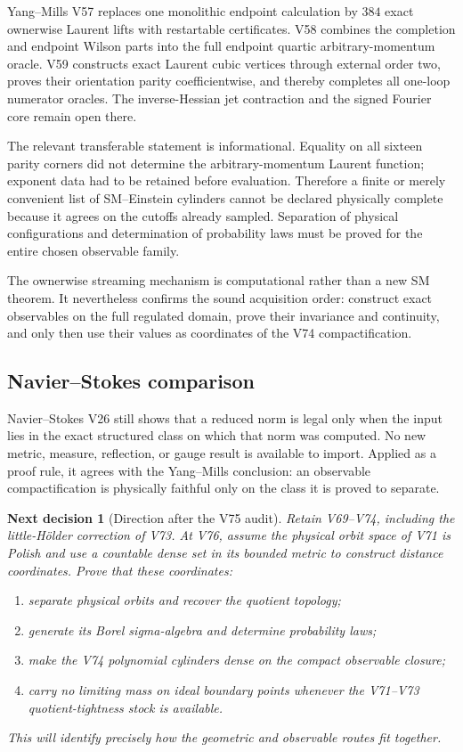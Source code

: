\documentclass[11pt]{article}
\newtheorem{decision}[theorem]{Next decision}
\theoremstyle{remark}
\begin{document}
Yang--Mills V57 replaces one monolithic endpoint calculation by
\(384\) exact ownerwise Laurent lifts with restartable certificates.
V58 combines the completion and endpoint Wilson parts into the full
endpoint quartic arbitrary-momentum oracle.  V59 constructs exact
Laurent cubic vertices through external order two, proves their
orientation parity coefficientwise, and thereby completes all
one-loop numerator oracles.  The inverse-Hessian jet contraction and
the signed Fourier core remain open there.

The relevant transferable statement is informational.  Equality on
all sixteen parity corners did not determine the arbitrary-momentum
Laurent function; exponent data had to be retained before
evaluation.  Therefore a finite or merely convenient list of
SM--Einstein cylinders cannot be declared physically complete
because it agrees on the cutoffs already sampled.  Separation of
physical configurations and determination of probability laws must
be proved for the entire chosen observable family.

The ownerwise streaming mechanism is computational rather than a new
SM theorem.  It nevertheless confirms the sound acquisition order:
construct exact observables on the full regulated domain, prove their
invariance and continuity, and only then use their values as
coordinates of the V74 compactification.

\subsection{Navier--Stokes comparison}

Navier--Stokes V26 still shows that a reduced norm is legal only when
the input lies in the exact structured class on which that norm was
computed.  No new metric, measure, reflection, or gauge result is
available to import.  Applied as a proof rule, it agrees with the
Yang--Mills conclusion: an observable compactification is physically
faithful only on the class it is proved to separate.

\begin{decision}[Direction after the V75 audit]
\label{dec:v12v75-next}
Retain V69--V74, including the little-Hölder correction of V73.
At V76, assume the physical orbit space of V71 is Polish and use a
countable dense set in its bounded metric to construct distance
coordinates.  Prove that these coordinates:
\begin{enumerate}
\item separate physical orbits and recover the quotient topology;
\item generate its Borel sigma-algebra and determine probability
      laws;
\item make the V74 polynomial cylinders dense on the compact
      observable closure;
\item carry no limiting mass on ideal boundary points whenever the
      V71--V73 quotient-tightness stock is available.
\end{enumerate}
This will identify precisely how the geometric and observable routes
fit together.
\end{decision}
\end{document}
